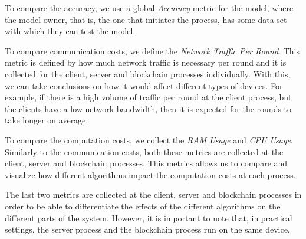 To compare the accuracy, we use a global \textit{Accuracy} metric for the model, where the model owner, that is, the one that initiates the process, has some data set with which they can test the model.

To compare communication costs, we define the \textit{Network Traffic Per Round}. This metric is defined by how much network traffic is necessary per round and it is collected for the client, server and blockchain processes individually. With this, we can take conclusions on how it would affect different types of devices. For example, if there is a high volume of traffic per round at the client process, but the clients have a low network bandwidth, then it is expected for the rounds to take longer on average.

To compare the computation costs, we collect the \textit{RAM Usage} and \textit{CPU Usage}. Similarly to the communication costs, both these metrics are collected at the client, server and blockchain processes. This metrics allows us to compare and visualize how different algorithms impact the computation costs at each process.

The last two metrics are collected at the client, server and blockchain processes in order to be able to differentiate the effects of the different algorithms on the different parts of the system. However, it is important to note that, in practical settings, the server process and the blockchain process run on the same device.
